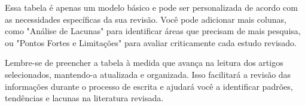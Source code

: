\documentclass[12pt,a4paper, brazil]{article}
\begin{document}
Essa tabela é apenas um modelo básico e pode ser personalizada de acordo com as necessidades específicas da sua revisão. Você pode adicionar mais colunas, como "Análise de Lacunas" para identificar áreas que precisam de mais pesquisa, ou "Pontos Fortes e Limitações" para avaliar criticamente cada estudo revisado.

Lembre-se de preencher a tabela à medida que avança na leitura dos artigos selecionados, mantendo-a atualizada e organizada. Isso facilitará a revisão das informações durante o processo de escrita e ajudará você a identificar padrões, tendências e lacunas na literatura revisada.

\printbibliography
\end{document}
